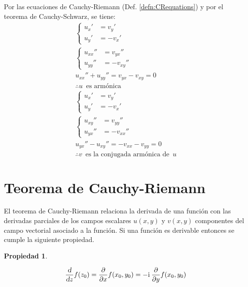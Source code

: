 \documentclass[a5paper,12pt,twoside]{book}
\newtheorem{prop}{{Propiedad}}[chapter]
\begin{document}
Por las ecuaciones de Cauchy-Riemann (Def. \ref{defn:CRequations}) y por el teorema de Cauchy-Schwarz, se tiene:
\begin{gather*}
    \left\{
    \begin{aligned}
        u_x' &= v_y'
        \\
        u_y' &= -v_x'
    \end{aligned}
    \right.
    \\[1ex]
    \left\{
    \begin{aligned}
        u_{xx}'' &= v_{yx}''
        \\
        u_{yy}'' &= -v_{xy}''
    \end{aligned}
    \right.
    \\[1ex]
    u_{xx}'' + u_{yy}''= v_{yx} - v_{xy} = 0
    \\
    \therefore u \enspace \textrm{es armónica}
    \\[1ex]
    \left\{
    \begin{aligned}
        u_x' &= v_y'
        \\
        u_y' &= -v_x'
    \end{aligned}
    \right.
    \\[1ex]
    \left\{
    \begin{aligned}
        u_{xy}'' &= v_{yy}''
        \\
        u_{yx}'' &= - v_{xx}''
    \end{aligned}
    \right.
    \\[1ex]
    u_{yx}'' - u_{xy}'' = - v_{xx} - v_{yy} = 0
    \\
    \therefore v \enspace \textrm{es la conjugada armónica de} \enspace u
\end{gather*}


\section{Teorema de Cauchy-Riemann}

El teorema de Cauchy-Riemann relaciona la derivada de una función con las derivadas parciales de los campos escalares $u(x,y)$ y $v(x,y)$ componentes del campo vectorial asociado a la función. Si una función es derivable entonces se cumple la siguiente propiedad.

\begin{mdframed}[style=MyFrame1]
    \begin{prop}
        \label{prop:CRtheorem}
    \end{prop}
    \begin{equation*}
        \frac{\textsl{d}}{\textsl{d} z} f(z_0)= \frac{\partial}{\partial x} f(x_0,y_0)= -\mathrm{i}\mkern1mu \, \frac{\partial}{\partial y} f(x_0,y_0)
    \end{equation*}
\end{mdframed}
\end{document}
